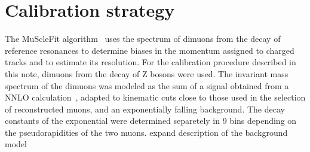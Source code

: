 \section{Calibration strategy}
The MuScleFit algorithm~\cite{CMS_AN_2010-059} uses the spectrum of dimuons from the decay of
reference resonances to determine biases in the momentum assigned to
charged tracks and to estimate its resolution.
For the calibration procedure described in this note, dimuons from the decay of
Z bosons were used. 
The invariant mass spectrum of the dimuons 
was modeled as the sum of a signal obtained from a NNLO
calculation~\cite{Dittmaier:2009cr}, adapted to kinematic cuts close to
those used in the selection of reconstructed muons, and an
exponentially falling background. The decay constants of the
exponential were determined separetely in 9 bins depending on the
pseudorapidities of the two muons.
\FIXME expand description of the background model 
